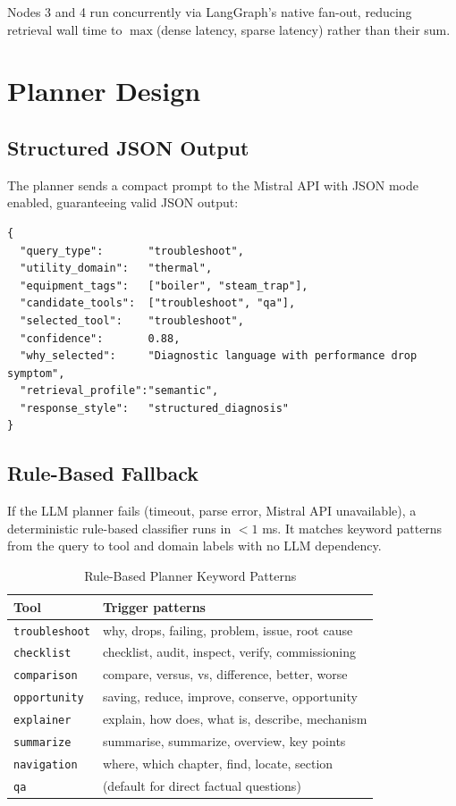 \documentclass[12pt,a4paper]{report}
\begin{document}
Nodes 3 and 4 run concurrently via LangGraph's native fan-out, reducing retrieval wall time to $\max$(dense latency, sparse latency) rather than their sum.

\section{Planner Design}

\subsection{Structured JSON Output}

The planner sends a compact prompt to the Mistral API with JSON mode enabled, guaranteeing valid JSON output:

\begin{lstlisting}[caption={Planner JSON output schema}]
{
  "query_type":       "troubleshoot",
  "utility_domain":   "thermal",
  "equipment_tags":   ["boiler", "steam_trap"],
  "candidate_tools":  ["troubleshoot", "qa"],
  "selected_tool":    "troubleshoot",
  "confidence":       0.88,
  "why_selected":     "Diagnostic language with performance drop symptom",
  "retrieval_profile":"semantic",
  "response_style":   "structured_diagnosis"
}
\end{lstlisting}

\subsection{Rule-Based Fallback}

If the LLM planner fails (timeout, parse error, Mistral API unavailable), a deterministic rule-based classifier runs in $<1$ ms. It matches keyword patterns from the query to tool and domain labels with no LLM dependency.

\begin{table}[H]
\centering
\caption{Rule-Based Planner Keyword Patterns}
\begin{tabular}{@{}ll@{}}
\toprule
\textbf{Tool} & \textbf{Trigger patterns} \\
\midrule
\texttt{troubleshoot} & why, drops, failing, problem, issue, root cause \\
\texttt{checklist} & checklist, audit, inspect, verify, commissioning \\
\texttt{comparison} & compare, versus, vs, difference, better, worse \\
\texttt{opportunity} & saving, reduce, improve, conserve, opportunity \\
\texttt{explainer} & explain, how does, what is, describe, mechanism \\
\texttt{summarize} & summarise, summarize, overview, key points \\
\texttt{navigation} & where, which chapter, find, locate, section \\
\texttt{qa} & (default for direct factual questions) \\
\bottomrule
\end{tabular}
\end{table}
\end{document}

